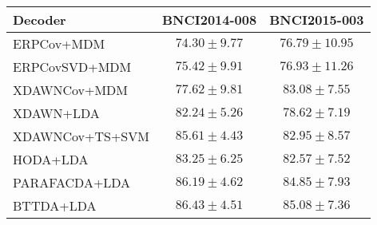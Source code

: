 \begin{tabularx}{\linewidth}{@{}Xcc@{}}
\toprule
Decoder &            BNCI2014-008 &            BNCI2015-003 \\
\midrule
     ERPCov+MDM &          $74.30\pm9.77$ &         $76.79\pm10.95$ \\
  ERPCovSVD+MDM &          $75.42\pm9.91$ &         $76.93\pm11.26$ \\
   XDAWNCov+MDM &          $77.62\pm9.81$ &          $83.08\pm7.55$ \\
      XDAWN+LDA &          $82.24\pm5.26$ &          $78.62\pm7.19$ \\
XDAWNCov+TS+SVM &          $85.61\pm4.43$ &          $82.95\pm8.57$ \\\midrule       HODA+LDA &          $83.25\pm6.25$ &          $82.57\pm7.52$ \\
  PARAFACDA+LDA &          $86.19\pm4.62$ &          $84.85\pm7.93$ \\
      BTTDA+LDA & \boldmath$86.43\pm4.51$ & \boldmath$85.08\pm7.36$ \\
\bottomrule
\end{tabularx}
